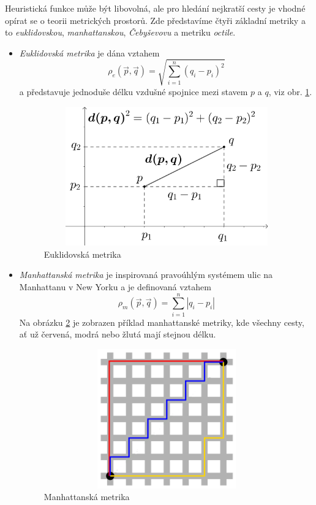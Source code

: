 Heuristická funkce může být libovolná, ale pro hledání nejkratší cesty je vhodné opírat se o teorii metrických prostorů. Zde představíme čtyři základní metriky a to \emph{euklidovskou}, \emph{manhattanskou}, \emph{Čebyševovu} a metriku \emph{octile}. \cite{Patel19972020}

\begin{itemize}
	\item \emph{Euklidovská metrika} je dána vztahem 
	\begin{equation}
	\rho_e\left(\vec{p},\vec{q}\right)=\sqrt{\sum_{i=1}^n\left(q_i-p_i\right)^2}
	\end{equation}
	a představuje jednoduše délku vzdušné spojnice mezi stavem $p$ a $q$, viz obr. \ref{obr:euclid}.
	
	\begin{figure}[htb]
		\begin{center}
			\includegraphics*[width=15cm,height=6cm,keepaspectratio]{obr/euclid}
		\end{center}
		\caption{Euklidovská metrika}
		\label{obr:euclid}
	\end{figure}
	
	\item \emph{Manhattanská metrika} je inspirovaná pravoúhlým systémem ulic na Manhattanu v New Yorku a je definovaná vztahem
	\begin{equation}
	\rho_m\left(\vec{p},\vec{q}\right)=\sum_{i=1}^n\left|q_i-p_i\right|
	\end{equation}
	Na obrázku \ref{obr:manhat} je zobrazen příklad manhattanské metriky, kde všechny cesty, ať už červená, modrá nebo žlutá mají stejnou délku. 
	
	\begin{figure}[htb]
		\begin{center}
			\includegraphics*[width=15cm,height=6cm,keepaspectratio]{obr/manhat}
		\end{center}
		\caption{Manhattanská metrika}
		\label{obr:manhat}
	\end{figure}


\end{itemize}
